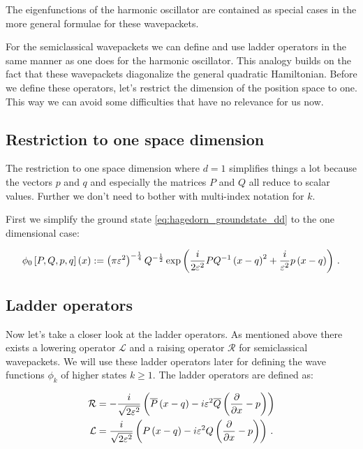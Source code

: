 The eigenfunctions of the harmonic oscillator are contained as special cases
in the more general formulae for these wavepackets.

For the semiclassical wavepackets we can define and use ladder operators in the
same manner as one does for the harmonic oscillator. This analogy builds on the fact that
these wavepackets diagonalize the general quadratic Hamiltonian. Before we define
these operators, let's restrict the dimension of the position space to one. This
way we can avoid some difficulties that have no relevance for us now.

\subsection{Restriction to one space dimension}

The restriction to one space dimension where $d=1$ simplifies things a lot because
the vectors $p$ and $q$ and especially the matrices $P$ and $Q$ all reduce to scalar
values. Further we don't need to bother with multi-index notation for $k$.

First we simplify the ground state \eqref{eq:hagedorn_groundstate_dd} to the one
dimensional case:

\begin{equation} \label{eq:hagedorn_groundstate_1d}
  \phi_0 \left[ P,Q,p,q \right] \left( x \right)
  :=
  \left(\pi\varepsilon^2\right)^{-\frac{1}{4}} Q^{-\frac{1}{2}}
  \exp \left(
      \frac{i}{2\varepsilon^2} PQ^{-1}\left(x-q\right)^2
      + \frac{i}{\varepsilon^2} p\left(x-q\right)
  \right) \,.
\end{equation}

\subsection{Ladder operators}

Now let's take a closer look at the ladder operators. As mentioned above there
exists a lowering operator $\mathcal{L}$ and a raising operator $\mathcal{R}$
for semiclassical wavepackets. We will use these ladder operators later for
defining the wave functions $\phi_k$ of higher states $k \geq 1$. The ladder
operators are defined as:

\begin{equation} \label{eq:definition_ladder_ops}
\begin{split}
  \mathcal{R} & = -\frac{i}{\sqrt{2\varepsilon^2}} \left( \overline{P} \left(x-q\right) - i \varepsilon^2 \overline{Q} \left( \frac{\partial}{\partial x}-p\right) \right) \\
  \mathcal{L} & = \frac{i}{\sqrt{2\varepsilon^2}} \left( P \left(x-q\right) - i \varepsilon^2 Q \left( \frac{\partial}{\partial x}-p\right) \right) \,.
\end{split}
\end{equation}

